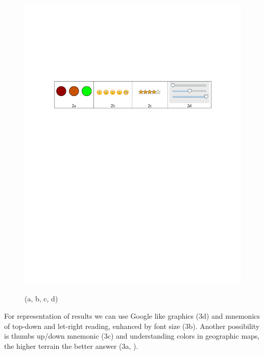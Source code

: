\begin{figure}[htbp]
	\centering
		\includegraphics[width=1.00\textwidth]{img/img2}
	\label{fig:img2}
	\caption{(a, b, c, d)}
\end{figure}
 


For representation of results we can use Google like graphics (3d) and mnemonics of top-down and let-right reading, enhanced by font size (3b). Another possibility is thumbs up/down mnemonic (3c) and understanding colors in geographic maps, the higher terrain the better answer (3a, \cite{43}).


